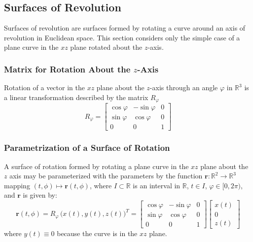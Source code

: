 \documentclass[11pt, a4paper]{article}
\begin{document}
\iffalse

Orienting a surface means defining a unit normal vector $ n $ at each point $ p $ such that $ n $ varies \textit{continuously} with $ p $. The surface is orientable if such an assignment is possible.

An orientation of a surface is a group of 3 vectors $ r_u, r_v, \pm r_u \cross r_v $ defined at each point, where the base of these 3 vectors are on the surface, $ r_u $ and $ r_v $ are perpendicular, and both $ r_u $ and $ r_v $  are tangential to the surface, and  $ r_u \cross r_v $ is normal to the surface. And the normal vector must vary continuously with points on the surface.

\fi

\subsection{Surfaces of Revolution}
Surfaces of revolution are surfaces formed by rotating a curve around an axis of revolution in Euclidean space. This section considers only the simple case of a plane curve in the $ xz $ plane rotated about the $ z $-axis.

\subsubsection{Matrix for Rotation About the $ z $-Axis}
Rotation of a vector in the $ xz $ plane about the $ z $-axis through an angle $ \varphi $ in $ \mathbb{R}^3 $ is a linear transformation described by the matrix $ R_{\varphi} $
\[ 	R_{\varphi} = 
\begin{bmatrix}
	\cos \varphi & -\sin \varphi & 0 \\
	\sin \varphi & \cos \varphi & 0 \\
	0 & 0 & 1
\end{bmatrix}
\]

\subsubsection{Parametrization of a Surface of Rotation}
A surface of rotation formed by rotating a plane curve in the $ xz $ plane about the $ z $ axis may be parameterized with the parameters by the function $ \bm{r} : \mathbb{R}^2 \rightarrow \mathbb{R}^3 $ mapping $ (t, \phi) \mapsto \bm{r}(t, \phi)$, where $ I \subset \mathbb{R}$ is an interval in $ \mathbb{R} $, $ t \in I $, $ \varphi \in [0, 2\pi) $, and $ \bm{r} $ is given by:
\[ 	\bm{r}(t, \phi) = R_{\varphi} \, \big(x(t), y(t), z(t) \big)^{T} = 
\begin{bmatrix}
	\cos \varphi & -\sin \varphi & 0 \\
	\sin \varphi & \cos \varphi & 0 \\
	0 & 0 & 1
\end{bmatrix}
\begin{bmatrix}
	x(t) \\
	0 \\
	z(t)
\end{bmatrix}
\]
where $ y(t) \equiv 0 $ because the curve is in the $ xz $ plane.
\end{document}
